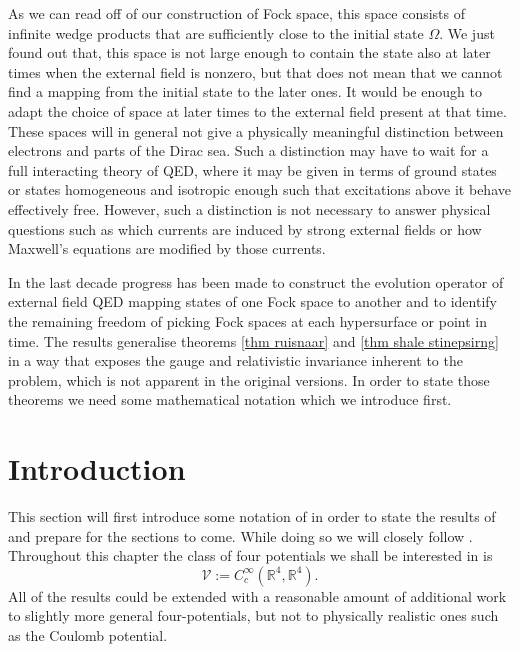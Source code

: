 \documentclass[b5paper,draft,openbib,12pt]{memoir}
\begin{document}
As we can read off of our construction of Fock space, this space 
consists of infinite wedge products that are sufficiently close 
to the initial state \(\Omega\). We just found out that, 
this space is not large enough to contain the state also at 
later times when the external field is nonzero, but that does 
not mean that we cannot find a mapping from the initial state 
to the later ones. It would be enough to adapt the choice of 
space at later times to the external field present at that time. 
These spaces will in general not give a physically meaningful 
distinction between electrons and parts of the Dirac sea. 
Such a distinction may have to wait 
for a full interacting theory of QED, where it may be given 
in terms of ground states or states homogeneous and isotropic 
enough such that excitations above it behave effectively free. 
However, such a distinction is not necessary to answer 
physical questions such as which currents are 
induced by strong external fields or how Maxwell's 
equations are modified by those currents.  

In the last decade progress has been made to construct 
the evolution operator of external 
field QED mapping states of one Fock space to another and 
to identify the remaining freedom of picking Fock spaces 
at each hypersurface or point in time. The results generalise 
theorems \ref{thm ruisnaar} and \ref{thm shale stinepsirng}
in a way that exposes the gauge and relativistic invariance 
inherent to the problem, which is not apparent 
in the original versions. In order to state those theorems 
we need some mathematical notation which we introduce first.


\section{Introduction}

This section will first introduce some notation of 
\cite{ivp0,ivp1,ivp2,deckert2016perspective} in order to 
state the results of \cite{ivp2} and prepare for the sections 
to come. While doing so we will closely follow 
\cite{deckert2016perspective}.
Throughout this chapter the class of four potentials we 
shall be 
interested in is 
\begin{equation}
  \mathcal{V}:= C_c^\infty(\mathbb{R}^4,\mathbb{R}^4).
\end{equation}
All of the results could be extended with a reasonable 
amount of additional work to slightly more general 
four-potentials, but not to physically realistic ones such as 
the Coulomb potential.  
\end{document}
